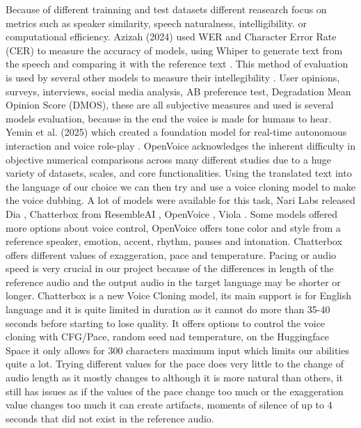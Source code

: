 \documentclass[12pt]{article}
\begin{document}
Because of different trainning and test datasets different reasearch focus on metrics such as speaker similarity, speech naturalness, intelligibility. or computational efficiency. Azizah (2024) used WER and Character Error Rate (CER) to measure the accuracy of models, using Whiper to generate text from the speech and comparing it with the reference text \cite{zero-shot-voice-cloning}. This method of evaluation is used by several other models to measure their intellegibility \cite{harminizaion-of-voice-cloning}\cite{chen2021v2cvisualvoicecloning}\cite{NAUTILUS}\cite{zero-shot-voice-cloning}. User opinions, surveys, interviews, social media analysis, AB preference test, Degradation Mean Opinion Score (DMOS), these are all subjective measures and used is several models evaluation, because in the end the voice is made for humans to hear. Yemin et al. (2025) which created a foundation model for real-time autonomous interaction and voice role-play \cite{viola-voice-role-play}. OpenVoice acknowledges the inherent difficulty in objective numerical comparisons across many different studies due to a huge variety of datasets, scales, and core functionalities. Using the translated text into the language of our choice we can then try and use a voice cloning model to make the voice dubbing. A lot of models were available for this task, Nari Labs released Dia \cite{Dia}, Chatterbox from ResembleAI \cite{chatterbox}, OpenVoice \cite{openvoice}, Viola \cite{viola-voice-role-play}. Some models offered more options about voice control, OpenVoice offers tone color and style from a reference speaker, emotion, accent, rhythm, pauses and intonation. Chatterbox offers different values of exaggeration, pace and temperature. Pacing or audio speed is very crucial in our project because of the differences in length of the reference audio and the output audio in the target language may be shorter or longer. Chatterbox is a new Voice Cloning model, its main support is for English language and it is quite limited in duration as it cannot do more than 35-40 seconds before starting to lose quality. It offers options to control the voice cloning with CFG/Pace, random seed nad temperature, on the Huggingface Space it only allows for 300 characters maximum input which limits our abilities quite a lot. Trying different values for the pace does very little to the change of audio length as it mostly changes to although it is more natural than others, it still has issues as if the values of the pace change too much or the exaggeration value changes too much it can create artifacts, moments of silence of up to 4 seconds that did not exist in the reference audio.
\end{document}
